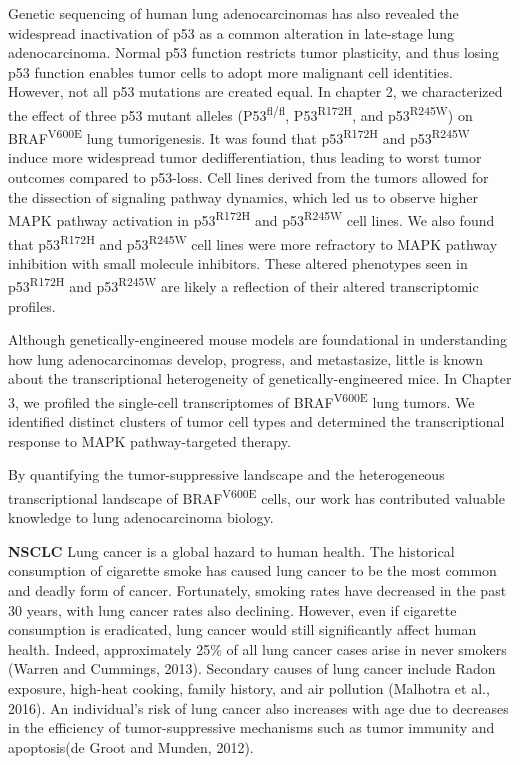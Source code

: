 Genetic sequencing of human lung adenocarcinomas has also revealed the widespread inactivation of p53 as a common alteration in late-stage lung adenocarcinoma. Normal p53 function restricts tumor plasticity, and thus losing p53 function enables tumor cells to adopt more malignant cell identities. However, not all p53 mutations are created equal. In chapter 2, we characterized the effect of three p53 mutant alleles (P53\textsuperscript{fl/fl}, P53\textsuperscript{R172H}, and p53\textsuperscript{R245W}) on BRAF\textsuperscript{V600E} lung tumorigenesis. It was found that p53\textsuperscript{R172H} and p53\textsuperscript{R245W} induce more widespread tumor dedifferentiation, thus leading to worst tumor outcomes compared to p53-loss. Cell lines derived from the tumors allowed for the dissection of signaling pathway dynamics, which led us to observe higher MAPK pathway activation in p53\textsuperscript{R172H} and p53\textsuperscript{R245W} cell lines. We also found that p53\textsuperscript{R172H} and p53\textsuperscript{R245W} cell lines were more refractory to MAPK pathway inhibition with small molecule inhibitors. These altered phenotypes seen in p53\textsuperscript{R172H} and p53\textsuperscript{R245W} are likely a reflection of their altered transcriptomic profiles.

Although genetically-engineered mouse models are foundational in understanding how lung adenocarcinomas develop, progress, and metastasize, little is known about the transcriptional heterogeneity of genetically-engineered mice. In Chapter 3, we profiled the single-cell transcriptomes of BRAF\textsuperscript{V600E} lung tumors. We identified distinct clusters of tumor cell types and determined the transcriptional response to MAPK pathway-targeted therapy.

By quantifying the tumor-suppressive landscape and the heterogeneous transcriptional landscape of BRAF\textsuperscript{V600E} cells, our work has contributed valuable knowledge to lung adenocarcinoma biology.

\textbf{NSCLC} Lung cancer is a global hazard to human health. The historical consumption of cigarette smoke has caused lung cancer to be the most common and deadly form of cancer. Fortunately, smoking rates have decreased in the past 30 years, with lung cancer rates also declining. However, even if cigarette consumption is eradicated, lung cancer would still significantly affect human health. Indeed, approximately 25\% of all lung cancer cases arise in never smokers (Warren and Cummings, 2013). Secondary causes of lung cancer include Radon exposure, high-heat cooking, family history, and air pollution (Malhotra et al., 2016). An individual's risk of lung cancer also increases with age due to decreases in the efficiency of tumor-suppressive mechanisms such as tumor immunity and apoptosis(de Groot and Munden, 2012).

